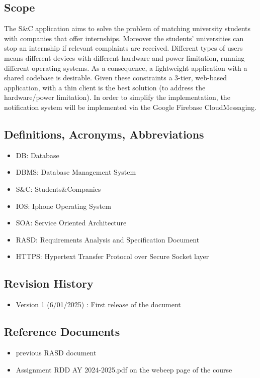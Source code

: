 \documentclass{article}
\begin{document}
\subsection{Scope}
The S\&C application aims to solve the problem of matching university students with companies that offer internships. Moreover the students' universities can stop an internship if relevant complaints are received.\newline
Different types of users means different devices with different hardware and power limitation, running different operating systems. \newline
As a consequence, a lightweight application with a shared codebase is desirable.\newline
Given these constraints a 3-tier, web-based application, with a thin client is the best solution (to address the hardware/power limitation).\newline
In order to simplify the implementation, the notification system will be implemented via the Google Firebase CloudMessaging.   

\subsection{Definitions, Acronyms, Abbreviations}
\begin{itemize}
    \item DB: Database
    \item DBMS: Database Management System
    \item S\&C: Students\&Companies
    \item IOS: Iphone Operating System
    \item SOA: Service Oriented Architecture
    \item RASD: Requirements Analysis and Specification Document 
    \item HTTPS: Hypertext Transfer Protocol over Secure Socket layer 
\end{itemize}

\subsection{Revision History}
\begin{itemize}
    \item Version 1 (6/01/2025) : First release of the document
\end{itemize}

\subsection{Reference Documents}
\begin{itemize}
    \item previous RASD document
    \item Assignment RDD AY 2024-2025.pdf on the webeep page of the course
\end{itemize}
\end{document}
